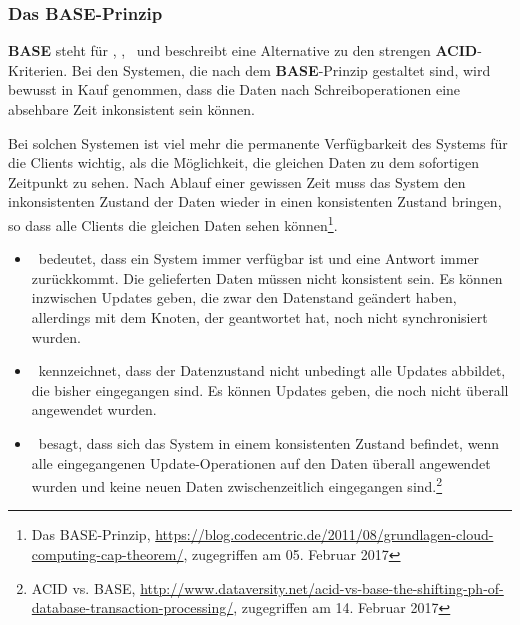 %

\subsubsection{Das BASE-Prinzip}\label{base}

\textbf{BASE} steht für \BAse, \baSe, \basE\ und beschreibt eine Alternative zu den strengen \textbf{ACID}-Kriterien.
Bei den Systemen, die nach dem \textbf{BASE}-Prinzip gestaltet sind, wird bewusst in Kauf genommen, dass die Daten nach Schreiboperationen eine absehbare Zeit inkonsistent sein können.

Bei solchen Systemen ist viel mehr die permanente Verfügbarkeit des Systems für die Clients wichtig, als die Möglichkeit, die gleichen Daten zu dem sofortigen Zeitpunkt zu sehen. Nach Ablauf einer gewissen Zeit muss das System den inkonsistenten Zustand der Daten wieder in einen konsistenten Zustand bringen, so dass alle Clients die gleichen Daten sehen können\footnote{Das BASE-Prinzip, \url{https://blog.codecentric.de/2011/08/grundlagen-cloud-computing-cap-theorem/}, zugegriffen am 05. Februar 2017}.

\begin{itemize}
\item \BAse\ bedeutet, dass ein System immer verfügbar ist und eine Antwort immer zurückkommt. Die gelieferten Daten müssen nicht konsistent sein. Es können inzwischen Updates geben, die zwar den Datenstand geändert haben, allerdings mit dem Knoten, der geantwortet hat, noch nicht synchronisiert wurden.

\item \baSe\ kennzeichnet, dass der Datenzustand nicht unbedingt alle Updates abbildet, die bisher eingegangen sind. Es können Updates geben, die noch nicht überall angewendet wurden.

\item \basE\ besagt, dass sich das System in einem konsistenten Zustand befindet, wenn alle eingegangenen Update-Operationen auf den Daten überall angewendet wurden und keine neuen Daten zwischenzeitlich eingegangen sind.\footnote{ACID vs. BASE, \url{http://www.dataversity.net/acid-vs-base-the-shifting-ph-of-database-transaction-processing/}, zugegriffen am 14. Februar 2017}
\end{itemize}

